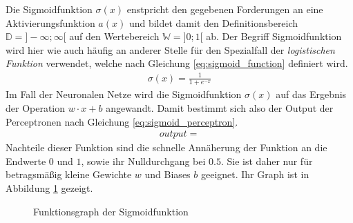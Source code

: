 \documentclass[../main.tex]{subfiles}
\begin{document}
Die Sigmoidfunktion $\sigma(x)$ enstpricht den gegebenen Forderungen an eine Aktivierungsfunktion $a(x)$ und bildet damit den Definitionsbereich $\mathbb{D} = ]-\infty; \infty [$ auf den Wertebereich $\mathbb{W} = ]0;1[$ ab. Der Begriff Sigmoidfunktion wird hier wie auch häufig an anderer Stelle für den Spezialfall der \emph{logistischen Funktion} verwendet, welche nach Gleichung \ref{eq:sigmoid_function} definiert wird.
\begin{align}
	\sigma(x) = \frac{1}{1 + e^{-x}} \label{eq:sigmoid_function}
\end{align}
Im Fall der Neuronalen Netze wird die Sigmoidfunktion $\sigma(x)$ auf das Ergebnis der Operation $w\cdot x + b$ angewandt. Damit bestimmt sich also der Output der Perceptronen nach Gleichung \ref{eq:sigmoid_perceptron}. 
\begin{align} %
	output = %
\end{align}
Nachteile dieser Funktion sind die schnelle Annäherung der Funktion an die Endwerte $0$ und $1$, sowie ihr Nulldurchgang bei $0.5$. Sie ist daher nur für betragsmäßig kleine Gewichte $w$ und Biases $b$ geeignet. Ihr Graph ist in Abbildung \ref{fig:sigmoid} gezeigt.
\begin{figure}
	\centering
	\caption{Funktionsgraph der Sigmoidfunktion}\label{fig:sigmoid}
\end{figure}
\end{document}
